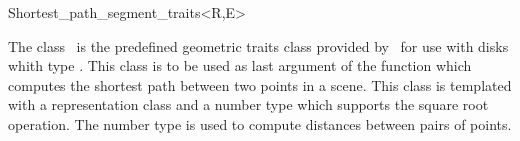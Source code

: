 
\begin{ccRefClass}{Shortest_path_segment_traits<R,E>}
\label{pageShortest_path_segment_traitsRef}

\ccDefinition

The class \ccRefName\ is the predefined geometric traits class provided by
\cgal\ for use with disks whith type .
This class is to be used as last argument of the  function
which computes the shortest path between two points in a scene.
This class is templated with a representation class  and a number type
 which supports the square root operation. The number type  is
used to compute distances between pairs of points.


\ccInheritsFrom
{}

\ccIsModel
{}

\ccSeeAlso

 \\

\ccTagDefaults
\end{ccRefClass}
\ccRefPageEnd
